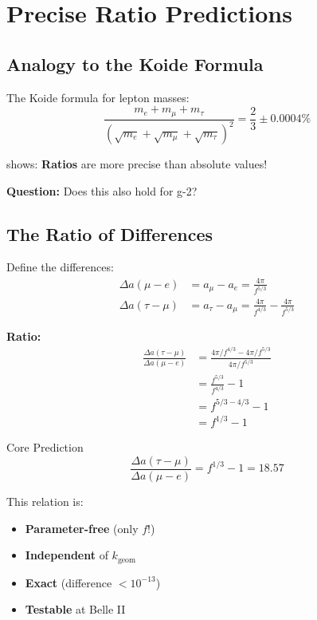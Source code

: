 	\section{Precise Ratio Predictions}
	
	\subsection{Analogy to the Koide Formula}
	
	The Koide formula for lepton masses:
	\begin{equation}
		\frac{m_e + m_\mu + m_\tau}{(\sqrt{m_e} + \sqrt{m_\mu} + \sqrt{m_\tau})^2} = \frac{2}{3} \pm 0.0004\%
	\end{equation}
	
	shows: \textbf{Ratios} are more precise than absolute values!
	
	\textbf{Question:} Does this also hold for g-2?
	
	\subsection{The Ratio of Differences}
	
	Define the differences:
	\begin{align}
		\Delta a(\mu - e) &= a_\mu - a_e = \frac{4\pi}{f^{5/3}} \\
		\Delta a(\tau - \mu) &= a_\tau - a_\mu = \frac{4\pi}{f^{4/3}} - \frac{4\pi}{f^{5/3}}
	\end{align}
	
	\textbf{Ratio:}
	\begin{align}
		\frac{\Delta a(\tau - \mu)}{\Delta a(\mu - e)} &= \frac{4\pi/f^{4/3} - 4\pi/f^{5/3}}{4\pi/f^{5/3}} \\
		&= \frac{f^{5/3}}{f^{4/3}} - 1 \\
		&= f^{5/3 - 4/3} - 1 \\
		&= f^{1/3} - 1
		\label{eq:ratio}
	\end{align}
	
	\begin{important}{Core Prediction}
		\begin{equation}
			\boxed{\frac{\Delta a(\tau - \mu)}{\Delta a(\mu - e)} = f^{1/3} - 1 = 18.57}
		\end{equation}
		
		This relation is:
		\begin{itemize}
			\item \textbf{Parameter-free} (only $f$!)
			\item \textbf{Independent} of $k_{\text{geom}}$
			\item \textbf{Exact} (difference $< 10^{-13}$)
			\item \textbf{Testable} at Belle II
		\end{itemize}
	\end{important}
	

